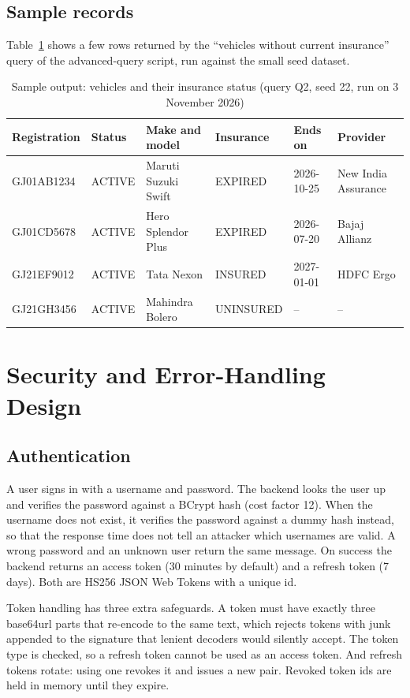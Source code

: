 \subsection{Sample records}
Table~\ref{tab:sample} shows a few rows returned by the ``vehicles without current
insurance'' query of the advanced-query script, run against the small seed dataset.
\begin{table}[H]
\centering\footnotesize
\caption{Sample output: vehicles and their insurance status (query Q2, seed 22, run on 3 November 2026)}\label{tab:sample}
\begin{tabularx}{\linewidth}{@{}p{2.2cm}p{2.0cm}p{2.7cm}p{2.0cm}p{2.1cm}X@{}}
\toprule \textbf{Registration} & \textbf{Status} & \textbf{Make and model} & \textbf{Insurance} & \textbf{Ends on} & \textbf{Provider}\\ \midrule
GJ01AB1234 & ACTIVE & Maruti Suzuki Swift & EXPIRED & 2026-10-25 & New India Assurance\\
GJ01CD5678 & ACTIVE & Hero Splendor Plus & EXPIRED & 2026-07-20 & Bajaj Allianz\\
GJ21EF9012 & ACTIVE & Tata Nexon & INSURED & 2027-01-01 & HDFC Ergo\\
GJ21GH3456 & ACTIVE & Mahindra Bolero & UNINSURED & -- & --\\
\bottomrule
\end{tabularx}
\end{table}

\section{Security and Error-Handling Design}\label{sec:security}
\subsection{Authentication}
A user signs in with a username and password. The backend looks the user up and verifies
the password against a BCrypt hash (cost factor 12). When the username does not exist,
it verifies the password against a dummy hash instead, so that the response time does not
tell an attacker which usernames are valid. A wrong password and an unknown user return the
same message. On success the backend returns an access token (30 minutes by default) and a
refresh token (7 days). Both are HS256 JSON Web Tokens \cite{rfc7519} with a unique id.

Token handling has three extra safeguards. A token must have exactly three base64url parts
that re-encode to the same text, which rejects tokens with junk appended to the signature
that lenient decoders would silently accept. The token type is checked, so a refresh token
cannot be used as an access token. And refresh tokens rotate: using one revokes it and
issues a new pair. Revoked token ids are held in memory until they expire.

